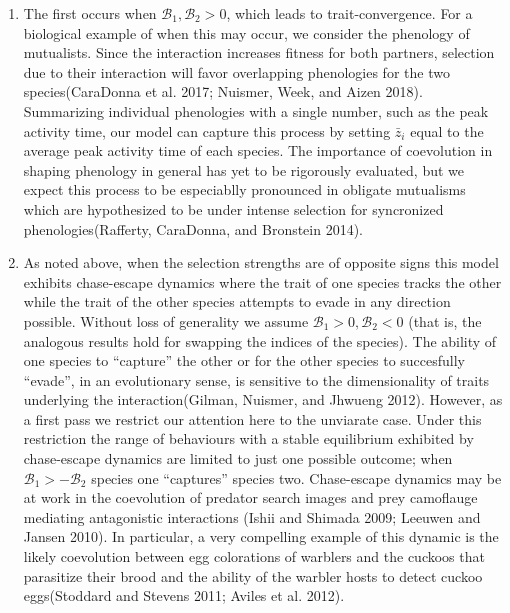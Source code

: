 \documentclass[]{article}
\begin{document}
\begin{enumerate}
\def\labelenumi{\arabic{enumi})}
\item
  The first occurs when \(\mathscr{B}_1,\mathscr{B}_2>0\), which leads
  to trait-convergence. For a biological example of when this may occur,
  we consider the phenology of mutualists. Since the interaction
  increases fitness for both partners, selection due to their
  interaction will favor overlapping phenologies for the two
  species(CaraDonna et al. 2017; Nuismer, Week, and Aizen 2018).
  Summarizing individual phenologies with a single number, such as the
  peak activity time, our model can capture this process by setting
  \(\bar z_i\) equal to the average peak activity time of each species.
  The importance of coevolution in shaping phenology in general has yet
  to be rigorously evaluated, but we expect this process to be
  especiablly pronounced in obligate mutualisms which are hypothesized
  to be under intense selection for syncronized phenologies(Rafferty,
  CaraDonna, and Bronstein 2014).
\item
  As noted above, when the selection strengths are of opposite signs
  this model exhibits chase-escape dynamics where the trait of one
  species tracks the other while the trait of the other species attempts
  to evade in any direction possible. Without loss of generality we
  assume \(\mathscr{B}_1>0,\mathscr{B}_2<0\) (that is, the analogous
  results hold for swapping the indices of the species). The ability of
  one species to ``capture'' the other or for the other species to
  succesfully ``evade'', in an evolutionary sense, is sensitive to the
  dimensionality of traits underlying the interaction(Gilman, Nuismer,
  and Jhwueng 2012). However, as a first pass we restrict our attention
  here to the unviarate case. Under this restriction the range of
  behaviours with a stable equilibrium exhibited by chase-escape
  dynamics are limited to just one possible outcome; when
  \(\mathscr{B}_1>-\mathscr{B}_2\) species one ``captures'' species two.
  Chase-escape dynamics may be at work in the coevolution of predator
  search images and prey camoflauge mediating antagonistic interactions
  (Ishii and Shimada 2009; Leeuwen and Jansen 2010). In particular, a
  very compelling example of this dynamic is the likely coevolution
  between egg colorations of warblers and the cuckoos that parasitize
  their brood and the ability of the warbler hosts to detect cuckoo
  eggs(Stoddard and Stevens 2011; Aviles et al. 2012).
\end{enumerate}
\end{document}
